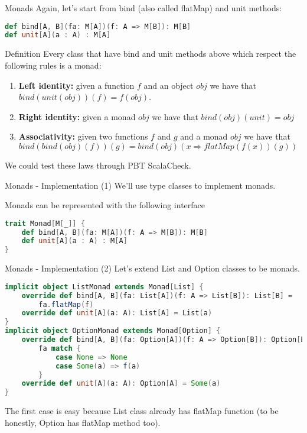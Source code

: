 \begin{frame}[fragile]{Monads}
	Again, let's start from bind (also called flatMap) and unit methods:
\begin{lstlisting}[language=scala]
def bind[A, B](fa: M[A])(f: A => M[B]): M[B]
def unit[A](a : A) : M[A]
\end{lstlisting}
	\begin{block}{Definition}
		Every class that have bind and unit methods above which respect the following rules is a monad:
		\begin{enumerate}[<+->]
			\item \textbf{Left identity:}  given a function $f$ and an object $obj$ we have that $bind(unit(obj))(f) = f(obj)$.
			\item \textbf{Right identity:} given a monad $obj$ we have that $bind(obj)(unit) = obj$
			\item \textbf{Associativity:} given two functions $f$ and $g$ and a monad $obj$ we have that 
			$bind(bind(obj)(f))(g) = bind(obj)(x \Rightarrow flatMap(f(x))(g))$
		\end{enumerate}
	\end{block}
	\pause[3]
	We could test these laws through PBT ScalaCheck.
\end{frame}

\begin{frame}[fragile]{Monads - Implementation (1)}	
	We'll use type classes to implement monads.
	
	Monads can be represented with the following interface
\begin{lstlisting}[language=scala]
trait Monad[M[_]] {
	def bind[A, B](fa: M[A])(f: A => M[B]): M[B]
	def unit[A](a : A) : M[A]
}			
\end{lstlisting}
\end{frame}

\begin{frame}[fragile]{Monads - Implementation (2)}	
	Let's extend List and Option classes to be monads.
\begin{lstlisting}[language=scala]
implicit object ListMonad extends Monad[List] {
	override def bind[A, B](fa: List[A])(f: A => List[B]): List[B] =
		fa.flatMap(f)
	override def unit[A](a: A): List[A] = List(a)
}
implicit object OptionMonad extends Monad[Option] {
	override def bind[A, B](fa: Option[A])(f: A => Option[B]): Option[B] =
		fa match {
			case None => None
			case Some(a) => f(a)
		}
	override def unit[A](a: A): Option[A] = Some(a)
}		
\end{lstlisting}		
	The first case is easy because List class already has flatMap function
	(to be honestly, Option has flatMap method too).
\end{frame}

